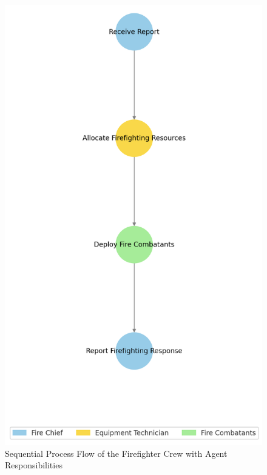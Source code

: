 \begin{figure}[h!]
	\centering
	\includegraphics[height=0.59\textheight]{figures/Firefighter_Crew_Flow.png}
	\caption{Sequential Process Flow of the Firefighter Crew with Agent Responsibilities}
	\label{fig:firefighter_flow}
\end{figure}

